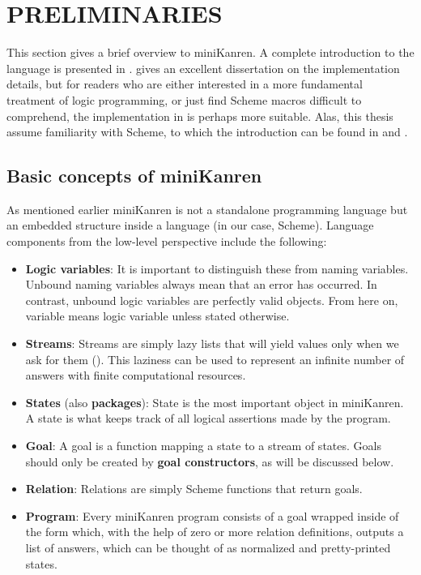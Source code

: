 \section{PRELIMINARIES}
\label{prelim}
This section gives a brief overview to miniKanren.
A complete introduction to the language is presented in \textcite{reasoned}.
\textcite{byrdphd} gives an excellent dissertation on the implementation details, but for readers who are either interested in a more fundamental treatment of logic programming, or just find Scheme macros difficult to comprehend, the implementation in \textcite{micro} is perhaps more suitable. Alas, this thesis assume familiarity with Scheme, to which the introduction can be found in \textcite{sicp} and \textcite{tspl4}.

\subsection{Basic concepts of miniKanren}
As mentioned earlier miniKanren is not a standalone programming language but an embedded structure inside a language (in our case, Scheme). Language components from the low-level perspective include the following:
\begin{itemize}
\item \textbf{Logic variables}: It is important to distinguish these from naming variables. Unbound naming variables always mean that an error has occurred. In contrast, unbound logic variables are perfectly valid objects. From here on, variable means logic variable unless stated otherwise.
\item \textbf{Streams}: Streams are simply lazy lists that will yield values only when we ask for them (\cite{sicp}). This laziness can be used to represent an infinite number of answers with finite computational resources.
\item \textbf{States} (also \textbf{packages}): State is the most important object in miniKanren. A state is what keeps track of all logical assertions made by the program.
\item \textbf{Goal}: A goal is a function mapping a state to a stream of states. Goals should only be created by \textbf{goal constructors}, as will be discussed below.
\item \textbf{Relation}: Relations are simply Scheme functions that return goals.
\item \textbf{Program}: Every miniKanren program consists of a goal wrapped inside of the  form which, with the help of zero or more relation definitions, outputs a list of answers, which can be thought of as normalized and pretty-printed states.
\end{itemize}

